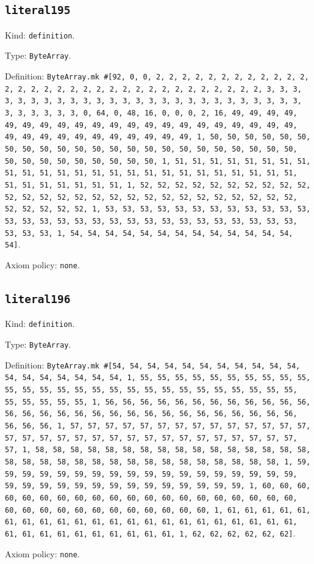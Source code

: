 \documentclass[11pt]{article}
\begin{document}
\subsection*{\texttt{literal195}}
\noindent Kind: \texttt{definition}.\par
\noindent Type: \texttt{ByteArray}.\par
\noindent Definition: \texttt{ByteArray.mk \#[92, 0, 0, 2, 2, 2, 2, 2, 2, 2, 2, 2, 2, 2, 2, 2, 2, 2, 2, 2, 2, 2, 2, 2, 2, 2, 2, 2, 2, 2, 2, 2, 2, 2, 2, 3, 3, 3, 3, 3, 3, 3, 3, 3, 3, 3, 3, 3, 3, 3, 3, 3, 3, 3, 3, 3, 3, 3, 3, 3, 3, 3, 3, 3, 3, 3, 3, 0, 64, 0, 48, 16, 0, 0, 0, 2, 16, 49, 49, 49, 49, 49, 49, 49, 49, 49, 49, 49, 49, 49, 49, 49, 49, 49, 49, 49, 49, 49, 49, 49, 49, 49, 49, 49, 49, 49, 49, 49, 49, 1, 50, 50, 50, 50, 50, 50, 50, 50, 50, 50, 50, 50, 50, 50, 50, 50, 50, 50, 50, 50, 50, 50, 50, 50, 50, 50, 50, 50, 50, 50, 50, 50, 1, 51, 51, 51, 51, 51, 51, 51, 51, 51, 51, 51, 51, 51, 51, 51, 51, 51, 51, 51, 51, 51, 51, 51, 51, 51, 51, 51, 51, 51, 51, 51, 51, 1, 52, 52, 52, 52, 52, 52, 52, 52, 52, 52, 52, 52, 52, 52, 52, 52, 52, 52, 52, 52, 52, 52, 52, 52, 52, 52, 52, 52, 52, 52, 52, 52, 1, 53, 53, 53, 53, 53, 53, 53, 53, 53, 53, 53, 53, 53, 53, 53, 53, 53, 53, 53, 53, 53, 53, 53, 53, 53, 53, 53, 53, 53, 53, 53, 53, 1, 54, 54, 54, 54, 54, 54, 54, 54, 54, 54, 54, 54, 54, 54]}.\par
\noindent Axiom policy: \texttt{none}.\par
\subsection*{\texttt{literal196}}
\noindent Kind: \texttt{definition}.\par
\noindent Type: \texttt{ByteArray}.\par
\noindent Definition: \texttt{ByteArray.mk \#[54, 54, 54, 54, 54, 54, 54, 54, 54, 54, 54, 54, 54, 54, 54, 54, 54, 54, 1, 55, 55, 55, 55, 55, 55, 55, 55, 55, 55, 55, 55, 55, 55, 55, 55, 55, 55, 55, 55, 55, 55, 55, 55, 55, 55, 55, 55, 55, 55, 55, 55, 1, 56, 56, 56, 56, 56, 56, 56, 56, 56, 56, 56, 56, 56, 56, 56, 56, 56, 56, 56, 56, 56, 56, 56, 56, 56, 56, 56, 56, 56, 56, 56, 56, 1, 57, 57, 57, 57, 57, 57, 57, 57, 57, 57, 57, 57, 57, 57, 57, 57, 57, 57, 57, 57, 57, 57, 57, 57, 57, 57, 57, 57, 57, 57, 57, 57, 1, 58, 58, 58, 58, 58, 58, 58, 58, 58, 58, 58, 58, 58, 58, 58, 58, 58, 58, 58, 58, 58, 58, 58, 58, 58, 58, 58, 58, 58, 58, 58, 58, 1, 59, 59, 59, 59, 59, 59, 59, 59, 59, 59, 59, 59, 59, 59, 59, 59, 59, 59, 59, 59, 59, 59, 59, 59, 59, 59, 59, 59, 59, 59, 59, 59, 1, 60, 60, 60, 60, 60, 60, 60, 60, 60, 60, 60, 60, 60, 60, 60, 60, 60, 60, 60, 60, 60, 60, 60, 60, 60, 60, 60, 60, 60, 60, 60, 60, 1, 61, 61, 61, 61, 61, 61, 61, 61, 61, 61, 61, 61, 61, 61, 61, 61, 61, 61, 61, 61, 61, 61, 61, 61, 61, 61, 61, 61, 61, 61, 61, 61, 1, 62, 62, 62, 62, 62, 62]}.\par
\noindent Axiom policy: \texttt{none}.\par
\end{document}
